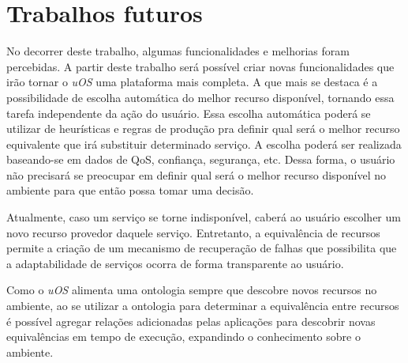 \section{Trabalhos futuros}
\label{sec:trabalhosFuturos}

No decorrer deste trabalho, algumas funcionalidades e melhorias foram percebidas. A partir deste trabalho será possível criar novas funcionalidades que irão tornar o \emph{uOS} uma plataforma mais completa. A que mais se destaca é a possibilidade de escolha automática do melhor recurso disponível, tornando essa tarefa independente da ação do usuário.  Essa escolha automática poderá se utilizar de heurísticas e regras de produção pra definir qual será o melhor recurso equivalente que irá substituir determinado serviço. A escolha poderá ser realizada baseando-se em dados 
de QoS, confiança, segurança, etc. Dessa forma, o usuário não precisará se preocupar em definir qual será o melhor recurso disponível no ambiente para que então possa tomar uma decisão.

Atualmente, caso um serviço se torne indisponível, caberá ao usuário escolher um novo recurso provedor daquele serviço.
Entretanto, a equivalência de recursos permite a criação de um mecanismo de recuperação de falhas que possibilita que a adaptabilidade de serviços ocorra de forma transparente ao usuário.

Como o \emph{uOS} alimenta uma ontologia sempre que descobre novos recursos no ambiente, ao se utilizar a ontologia para determinar a equivalência entre recursos é possível agregar relações adicionadas pelas aplicações para descobrir novas equivalências em tempo de execução, expandindo o conhecimento sobre o ambiente.